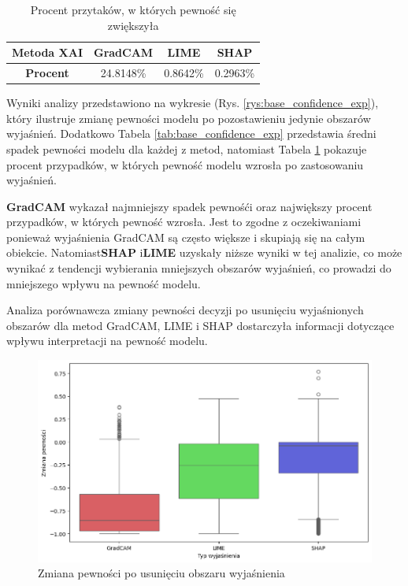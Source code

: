 \begin{table}[h]
	\centering
	\begin{tabular}{|c|c|c|c|}
		\hline
		\textbf{Metoda XAI} & \textbf{GradCAM} & \textbf{LIME} & \textbf{SHAP} \\
		\hline
		\textbf{Procent}    & 24.8148\%        & 0.8642\%      & 0.2963\%      \\
		\hline
	\end{tabular}
	\caption{Procent przytaków, w których pewność się zwiększyła}
	\label{tab:base_confidence_exp_percent}
\end{table}

Wyniki analizy przedstawiono na wykresie (Rys. \ref{rys:base_confidence_exp}), który ilustruje zmianę pewności modelu po pozostawieniu jedynie obszarów wyjaśnień.
Dodatkowo Tabela \ref{tab:base_confidence_exp} przedstawia średni spadek pewności modelu dla każdej z metod, natomiast Tabela \ref{tab:base_confidence_exp_percent} pokazuje procent przypadków, w których pewność modelu wzrosła po zastosowaniu wyjaśnień.

\textbf{GradCAM} wykazał najmniejszy spadek pewnośći oraz największy procent przypadków, w których pewność wzrosła.
Jest to zgodne z oczekiwaniami ponieważ wyjaśnienia GradCAM są często większe i skupiają się na całym obiekcie.
Natomiast\textbf{SHAP} i\textbf{LIME} uzyskały niższe wyniki w tej analizie, co może wynikać z tendencji wybierania mniejszych obszarów wyjaśnień, co prowadzi do mniejszego wpływu na pewność modelu.  

\vspace{1cm}

Analiza porównawcza zmiany pewności decyzji po usunięciu wyjaśnionych obszarów dla metod GradCAM, LIME i SHAP dostarczyła informacji dotyczące wpływu interpretacji na pewność modelu.

\begin{figure}[h]
	\centering\includegraphics[width=.9\textwidth]{img/base_confidence_no_exp}
	\caption{Zmiana pewności po usunięciu obszaru wyjaśnienia}  \label{rys:base_confidence_no_exp}
\end{figure}

